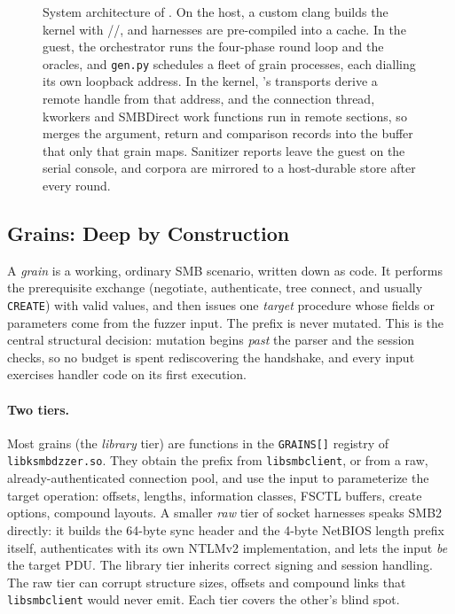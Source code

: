 \documentclass{article}
\begin{document}
\begin{figure}[t]
\caption{System architecture of \toolname. On the host, a custom clang builds
the kernel with \traceargs/\traceret/\tracecmp, and harnesses are pre-compiled
into a cache. In the guest, the orchestrator runs the four-phase round loop and
the oracles, and \texttt{gen.py} schedules a fleet of \libfuzzer grain
processes, each dialling its own loopback address. In the kernel, \ksmbd's
transports derive a remote handle from that address, and the connection thread,
kworkers and SMBDirect work functions run in remote sections, so \kcovdf
merges the argument, return and comparison records into the buffer that only
that grain maps. Sanitizer reports leave the guest on the serial console, and
corpora are mirrored to a host-durable store after every round.}\label{fig:arch}
\end{figure}

\subsection{Grains: Deep by Construction}\label{sec:grain}

A \emph{grain} is a working, ordinary SMB scenario, written down as code. It
performs the prerequisite exchange (negotiate, authenticate, tree connect,
and usually \texttt{CREATE}) with valid values, and then issues one
\emph{target} procedure whose fields or parameters come from the fuzzer
input. The prefix is never mutated. This is the central structural decision:
mutation begins \emph{past} the parser and the session checks, so no budget
is spent rediscovering the handshake, and every input exercises handler code
on its first execution.

\paragraph{Two tiers.} Most grains (the \emph{library} tier) are functions in
the \texttt{GRAINS[]} registry of \texttt{libksmbdzzer.so}. They obtain the
prefix from \texttt{libsmbclient}, or from a raw, already-authenticated
connection pool, and use the input to parameterize the target operation:
offsets, lengths, information classes, FSCTL buffers, create options,
compound layouts. A smaller \emph{raw} tier of socket harnesses speaks SMB2
directly: it builds the 64-byte sync header and the 4-byte NetBIOS length
prefix itself, authenticates with its own NTLMv2 implementation, and lets the
input \emph{be} the target PDU. The library tier inherits correct signing and
session handling. The raw tier can corrupt structure sizes, offsets and
compound links that \texttt{libsmbclient} would never emit. Each tier covers
the other's blind spot.
\end{document}
